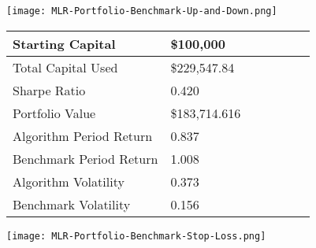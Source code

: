 \begin{center}  
    \texttt{[image: MLR-Portfolio-Benchmark-Up-and-Down.png]}
    \label{fig:nonfloat}
\end{center}

\begin{center}
    \begin{tabular}{ | l | l | l | | l | l | l | p{5cm} |}
    \hline
    Starting Capital & \$100,000 \\ \hline
    Total Capital Used & \$229,547.84 \\ \hline
    Sharpe Ratio & 0.420 \\ \hline
    Portfolio Value & \$183,714.616 \\ \hline
    Algorithm Period Return & 0.837 \\ \hline
    Benchmark Period Return & 1.008 \\ \hline
    Algorithm Volatility & 0.373 \\ \hline
    Benchmark Volatility & 0.156 \\
    \hline
    \end{tabular}
    \label{table:nonfloat}
\end{center}

\begin{center}  
    \texttt{[image: MLR-Portfolio-Benchmark-Stop-Loss.png]}
    \label{fig:nonfloat}
\end{center}
